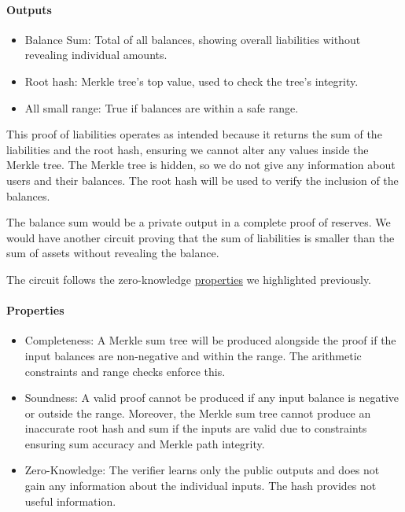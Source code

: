\paragraph{Outputs}
\begin{itemize}
   \item Balance Sum: Total of all balances, showing overall liabilities without revealing individual amounts.
   \item Root hash: Merkle tree's top value, used to check the tree's integrity.
   \item All small range: True if balances are within a safe range.
   \end{itemize}


This proof of liabilities operates as intended because it returns the sum of the liabilities and the root hash, ensuring we cannot alter any values inside the Merkle tree. 
The Merkle tree is hidden, so we do not give any information about users and their balances.
The root hash will be used to verify the inclusion of the balances.

The balance sum would be a private output in a complete proof of reserves. We would have another circuit proving that the sum of liabilities is smaller
than the sum of assets without revealing the balance.

The circuit follows the zero-knowledge \hyperref[subsec:zkp]{properties} we highlighted previously. 
\paragraph{Properties}
\begin{itemize}
   \item Completeness: A Merkle sum tree will be produced alongside the proof if the input balances are non-negative and within the range. The arithmetic constraints and range checks enforce this.
   \item Soundness: A valid proof cannot be produced if any input balance is negative or outside the range. Moreover, the Merkle sum tree cannot produce an inaccurate root hash and sum if the inputs are valid due to constraints ensuring sum accuracy and Merkle path integrity.
   \item Zero-Knowledge: The verifier learns only the public outputs and does not gain any information about the individual inputs. The hash provides not useful information.
   \end{itemize}


